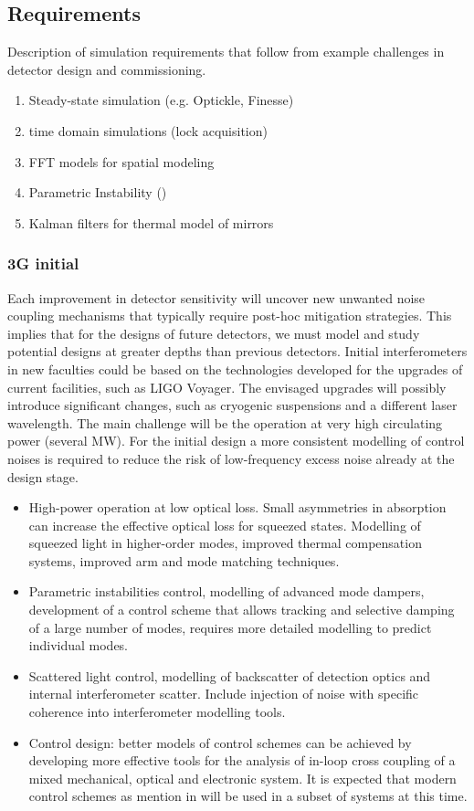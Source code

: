 \subsection{Requirements}
Description of simulation requirements that follow from example 
challenges in detector design and commissioning.
\begin{enumerate}
\item Steady-state simulation (e.g. Optickle, Finesse)
\item time domain simulations (lock acquisition)
\item FFT models for spatial modeling
\item Parametric Instability ()
\item Kalman filters for thermal model of mirrors
\end{enumerate}

\subsubsection{3G initial}
Each improvement in detector sensitivity will uncover new unwanted 
noise coupling mechanisms that typically require post-hoc
mitigation strategies. This implies that for the designs of
future detectors, we must model and study potential designs at 
greater depths than previous detectors.
Initial interferometers in new faculties
could be based on the technologies developed for the
upgrades of current facilities, such as LIGO Voyager.
The envisaged upgrades will possibly introduce 
significant changes, such as cryogenic
suspensions and a different laser wavelength. 
The main challenge will be the operation  at very high circulating 
power (several MW). For the initial design a more  consistent
modelling of control noises is required  to reduce the risk of
low-frequency excess noise already at the design stage.

\begin{itemize}
\item High-power operation at low optical loss. Small asymmetries
in absorption can increase the effective optical loss for squeezed
states. Modelling of squeezed light in higher-order modes, improved
thermal compensation systems, improved arm and mode matching
techniques.
\item Parametric instabilities control, modelling of advanced mode
  dampers, development of a control scheme that
  allows tracking and selective damping of a large number of modes,
  requires more detailed modelling to predict individual modes.
\item Scattered light control, modelling of backscatter of detection
optics and internal interferometer scatter. Include injection of
noise with specific coherence into interferometer modelling tools.
\item Control design: better models of control schemes can be
  achieved by developing more effective tools
for the analysis of in-loop cross coupling of a mixed mechanical, 
optical and electronic system. It is expected that modern control
schemes as mention in  will be used in a subset of
systems at this time. 
\end{itemize}

